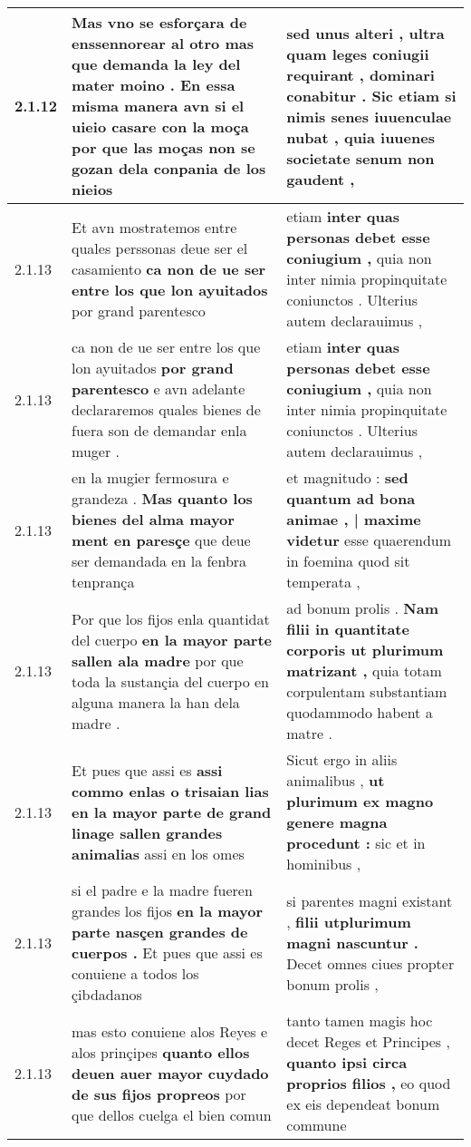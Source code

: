 \begin{tabular}{|p{1cm}|p{6.5cm}|p{6.5cm}|}
2.1.12 & Mas vno se esforçara de enssennorear al otro \textbf{ mas que demanda la ley del mater moino . En essa misma manera avn si el uieio casare con la moça } por que las moças non se gozan dela conpania de los nieios & sed unus alteri , \textbf{ ultra quam leges coniugii requirant , dominari conabitur . Sic etiam si nimis senes iuuenculae nubat , } quia iuuenes societate senum non gaudent , \\\hline
2.1.13 & Et avn mostratemos entre quales perssonas deue ser el casamiento \textbf{ ca non de ue ser entre los que lon ayuitados } por grand parentesco & etiam \textbf{ inter quas personas debet esse coniugium , } quia non inter nimia propinquitate coniunctos . Ulterius autem declarauimus , \\\hline
2.1.13 & ca non de ue ser entre los que lon ayuitados \textbf{ por grand parentesco } e avn adelante declararemos quales bienes de fuera son de demandar enla muger . & etiam \textbf{ inter quas personas debet esse coniugium , } quia non inter nimia propinquitate coniunctos . Ulterius autem declarauimus , \\\hline
2.1.13 & en la mugier fermosura e grandeza . \textbf{ Mas quanto los bienes del alma mayor ment en paresçe } que deue ser demandada en la fenbra tenprança & et magnitudo : \textbf{ sed quantum ad bona animae , | maxime videtur } esse quaerendum in foemina quod sit temperata , \\\hline
2.1.13 & Por que los fijos enla quantidat del cuerpo \textbf{ en la mayor parte sallen ala madre } por que toda la sustançia del cuerpo en alguna manera la han dela madre . & ad bonum prolis . \textbf{ Nam filii in quantitate corporis ut plurimum matrizant , } quia totam corpulentam substantiam quodammodo habent a matre . \\\hline
2.1.13 & Et pues que assi es \textbf{ assi commo enlas o trisaian lias en la mayor parte de grand linage sallen grandes animalias } assi en los omes & Sicut ergo in aliis animalibus , \textbf{ ut plurimum ex magno genere magna procedunt : } sic et in hominibus , \\\hline
2.1.13 & si el padre e la madre fueren grandes los fijos \textbf{ en la mayor parte nasçen grandes de cuerpos . } Et pues que assi es conuiene a todos los çibdadanos & si parentes magni existant , \textbf{ filii utplurimum magni nascuntur . } Decet omnes ciues propter bonum prolis , \\\hline
2.1.13 & mas esto conuiene alos Reyes e alos prinçipes \textbf{ quanto ellos deuen auer mayor cuydado de sus fijos propreos } por que dellos cuelga el bien comun & tanto tamen magis hoc decet Reges et Principes , \textbf{ quanto ipsi circa proprios filios , } eo quod ex eis dependeat bonum commune \\\hline

\end{tabular}
